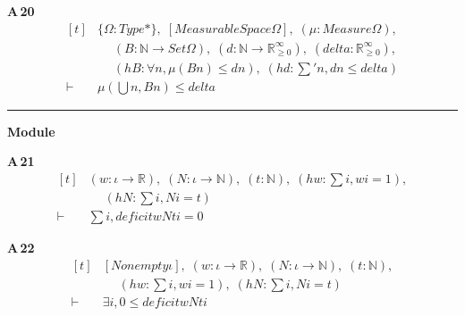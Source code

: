 \noindent\textbf{A\,20}\quad{}
{\footnotesize\[ \begin{aligned}[t]
&\{ \Omega : \mathit{Type}*\},\; [\mathit{MeasurableSpace} \Omega ],\; (\mu : \mathit{Measure} \Omega ),\\
&\quad \; (\mathit{B} : \mathbb{N} \to \mathit{Set} \Omega ),\; (\mathit{d} : \mathbb{N} \to \mathbb{R}_{\geq0}^{\infty} ),\; (\mathit{delta} : \mathbb{R}_{\geq0}^{\infty} ),\\
&\quad \; (\mathit{hB} : \forall \mathit{n}, \mu (\mathit{B} \mathit{n}) \leq \mathit{d} \mathit{n}),\; (\mathit{hd} : \textstyle\sum ' \mathit{n}, \mathit{d} \mathit{n} \leq \mathit{delta})\\
\vdash\;&\mu (⋃ \mathit{n}, \mathit{B} \mathit{n}) \leq \mathit{delta}
\end{aligned} \]}

\vspace{4pt}\noindent\rule{\columnwidth}{0.4pt}\par\vspace{2pt}
\noindent\textbf{Module }\par\vspace{3pt}

\noindent\textbf{A\,21}\quad{}
{\footnotesize\[ \begin{aligned}[t]
&(\mathit{w} : \iota \to \mathbb{R} ),\; (\mathit{N} : \iota \to \mathbb{N} ),\; (\mathit{t} : \mathbb{N} ),\; (\mathit{hw} : \textstyle\sum \mathit{i}, \mathit{w} \mathit{i} = 1),\\
&\quad \; (\mathit{hN} : \textstyle\sum \mathit{i}, \mathit{N} \mathit{i} = \mathit{t})\\
\vdash\;&\textstyle\sum \mathit{i}, \mathit{deficit} \mathit{w} \mathit{N} \mathit{t} \mathit{i} = 0
\end{aligned} \]}

\noindent\textbf{A\,22}\quad{}
{\footnotesize\[ \begin{aligned}[t]
&[\mathit{Nonempty} \iota ],\; (\mathit{w} : \iota \to \mathbb{R} ),\; (\mathit{N} : \iota \to \mathbb{N} ),\; (\mathit{t} : \mathbb{N} ),\\
&\quad \; (\mathit{hw} : \textstyle\sum \mathit{i}, \mathit{w} \mathit{i} = 1),\; (\mathit{hN} : \textstyle\sum \mathit{i}, \mathit{N} \mathit{i} = \mathit{t})\\
\vdash\;&\exists \mathit{i}, 0 \leq \mathit{deficit} \mathit{w} \mathit{N} \mathit{t} \mathit{i}
\end{aligned} \]}

